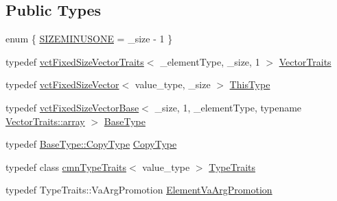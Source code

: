 \subsection*{Public Types}
\begin{DoxyCompactItemize}
\item 
enum \{ \hyperlink{group__cisst_vector_ggae684c096a8e0682238147d0cbc182cdeaa60fa332debc82a5c232c3330c14f4fd}{S\+I\+Z\+E\+M\+I\+N\+U\+S\+O\+N\+E} = \+\_\+size -\/ 1
 \}
\item 
typedef \hyperlink{classvct_fixed_size_vector_traits}{vct\+Fixed\+Size\+Vector\+Traits}$<$ \+\_\+element\+Type, \+\_\+size, 1 $>$ \hyperlink{classvct_fixed_size_vector_a82ab46671bc55178f97dd3245aed0600}{Vector\+Traits}
\item 
typedef \hyperlink{classvct_fixed_size_vector}{vct\+Fixed\+Size\+Vector}$<$ value\+\_\+type, \+\_\+size $>$ \hyperlink{classvct_fixed_size_vector_ab843a1db4f68a04960de8f4fea28adda}{This\+Type}
\item 
typedef \hyperlink{classvct_fixed_size_vector_base}{vct\+Fixed\+Size\+Vector\+Base}$<$ \+\_\+size, 1, \+\_\+element\+Type, typename \hyperlink{classvct_fixed_size_vector_traits_ab86355023bee9fbca9ee14640c6b7f4e}{Vector\+Traits\+::array} $>$ \hyperlink{classvct_fixed_size_vector_a04088d3a17a06af2d59f3bd99c42fb75}{Base\+Type}
\item 
typedef \hyperlink{classvct_fixed_size_vector_base_a136da6f4bb90964f3f156533f85416d9}{Base\+Type\+::\+Copy\+Type} \hyperlink{classvct_fixed_size_vector_afcfc466ed71975aef98c2789fd3e4dcf}{Copy\+Type}
\item 
typedef class \hyperlink{classcmn_type_traits}{cmn\+Type\+Traits}$<$ value\+\_\+type $>$ \hyperlink{classvct_fixed_size_vector_a31021c195f3f1ccf57f4bede713bd629}{Type\+Traits}
\item 
typedef Type\+Traits\+::\+Va\+Arg\+Promotion \hyperlink{classvct_fixed_size_vector_a1adb96488f833cc25746022bdb2faf80}{Element\+Va\+Arg\+Promotion}
\end{DoxyCompactItemize}
